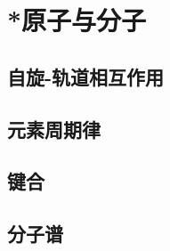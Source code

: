

\section{*原子与分子}\label{30-3}

\subsection{自旋-轨道相互作用}\label{30-3-1}

\subsection{元素周期律}\label{30-3-2}

\subsection{键合}\label{30-3-3}

\subsection{分子谱}\label{30-3-4}